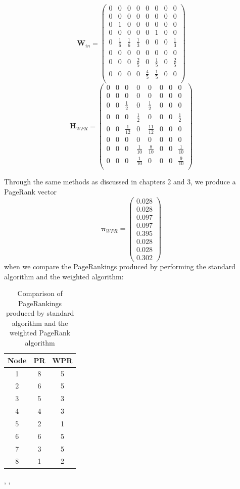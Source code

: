 \documentclass[11pt]{report}
\begin{document}
\[\textbf{W}_{in}=\left(
\begin{array}{cccccccc}
0 & 0 & 0 & 0 & 0 & 0 & 0 & 0 \\
0 & 0 & 0 & 0 & 0 & 0 & 0 & 0\\
0 & 1 & 0 & 0 & 0 & 0 & 0 & 0\\
0 & 0 & 0 & 0 & 0 & 1 & 0 & 0\\
0 & \frac{1}{6} & \frac{1}{6} & \frac{1}{3} & 0 & 0 & 0 & \frac{1}{3}\\
0 & 0 & 0 & 0 & 0 & 0 & 0 & 0 \\
0 & 0 & 0 & \frac{2}{5} & 0 & \frac{1}{5} & 0 & \frac{2}{5}\\
0 & 0 & 0 & 0 & \frac{4}{5} & \frac{1}{5} & 0 & 0\\
\end{array}
\right)	\]
\[\textbf{H}_{WPR}=\left(
\begin{array}{cccccccc}
0 & 0 & 0 & 0 & 0 & 0 & 0 & 0 \\
0 & 0 & 0 & 0 & 0 & 0 & 0 & 0\\
0 & 0 & \frac{1}{2} & 0 & \frac{1}{2} & 0 & 0 & 0\\
0 & 0 & 0 & \frac{1}{2} & 0 & 0 & 0 & \frac{1}{2}\\
0 & 0 & \frac{1}{12} & 0 & \frac{11}{12} & 0 & 0 & 0\\
0 & 0 & 0 & 0 & 0 & 0 & 0 & 0 \\
0 & 0 & 0 & \frac{1}{10} & \frac{8}{10} & 0 & 0 & \frac{1}{10}\\
0 & 0 & 0 & \frac{1}{10} & 0 & 0 & 0 & \frac{9}{10}\\
\end{array}
\right)	\]

Through the same methods as discussed in chapters 2 and 3, we produce a PageRank vector \[\boldsymbol\pi_{WPR} = \left(
\begin{array}{c}
0.028 \\
0.028 \\
0.097 \\
0.097 \\
0.395 \\
0.028 \\
0.028 \\
0.302
\end{array}
\right)\]
when we compare the PageRankings produced by performing the standard algorithm and the weighted algorithm:
\begin{table}[H] \caption{Comparison of PageRankings produced by standard algorithm and the weighted PageRank algorithm}
 \centering
 \begin{tabular} {c| c c} 
 Node & PR & WPR \\ [0.5ex] 
 \hline
 1&8&5\\
 2&6&5\\
 3&5&3\\
 4&4&3\\
 5&2&1\\
 6&6&5\\
 7&3&5\\
 8&1&2\\
 \end{tabular}
 \label{comparison}
\end{table}
\cite{langville}, \cite{xing2004weighted}, \cite{baeza2004web}
\end{document}
